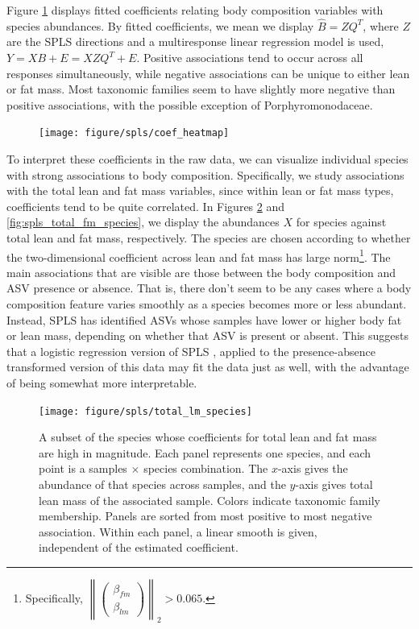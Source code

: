 \documentclass[14pt]{extarticle}
\begin{document}
Figure \ref{fig:spls_coef_heatmap} displays fitted coefficients relating body
composition variables with species abundances. By fitted coefficients, we mean
we display $\hat{B} = ZQ^T$, where $Z$ are the SPLS directions and a
multiresponse linear regression model is used, $Y = XB + E = XZQ^T + E$.
Positive associations tend to occur across all responses
simultaneously, while negative associations can be unique to either lean or fat
mass. Most taxonomic families seem to have slightly more negative than positive
associations, with the possible exception of Porphyromonodaceae.

\begin{figure}
  \centering
  \texttt{[image: figure/spls/coef\_heatmap]}
  \caption{\label{fig:spls_coef_heatmap} }
\end{figure}

To interpret these coefficients in the raw data, we can visualize individual
species with strong associations to body composition. Specifically, we study
associations with the total lean and fat mass variables, since within lean or
fat mass types, coefficients tend to be quite correlated. In Figures
\ref{fig:spls_total_lm_species} and \ref{fig:spls_total_fm_species}, we display
the abundances $X$ for species against total lean and fat mass, respectively.
The species are chosen according to whether the two-dimensional coefficient
across lean and fat mass has large norm\footnote{Specifically,
  $\left\| \begin{pmatrix} \beta_{fm} \\ \beta_{lm} \end{pmatrix} \right\|_{2} >
  0.065$.}. The main associations that are visible are those between the body
composition and ASV presence or absence. That is, there don't seem to be any
cases where a body composition feature varies smoothly as a species becomes more
or less abundant. Instead, SPLS has identified ASVs whose samples have lower or
higher body fat or lean mass, depending on whether that ASV is present or
absent. This suggests that a logistic regression version of SPLS
\citep{chung2010sparse}, applied to the presence-absence transformed version of
this data may fit the data just as well, with the advantage of being somewhat
more interpretable.

\begin{figure}
  \centering
  \texttt{[image: figure/spls/total\_lm\_species]}
  \caption{A subset of the species whose coefficients for total lean and fat
    mass are high in magnitude. Each panel represents one species, and each
    point is a samples $\times$ species combination. The $x$-axis gives the
    abundance of that species across samples, and the $y$-axis gives total lean
    mass of the associated sample. Colors indicate taxonomic family membership.
    Panels are sorted from most positive to most negative association. Within
    each panel, a linear smooth is given, independent of the estimated
    coefficient.
    \label{fig:spls_total_lm_species} }
\end{figure}
\end{document}
